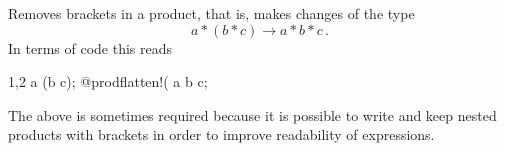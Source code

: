 
Removes brackets in a product, that is, makes changes of the type
\begin{equation}
a*(b*c) \rightarrow a*b*c\, .
\end{equation}
In terms of code this reads
\begin{screen}{1,2}
a (b c);
@prodflatten!(%
a b c;
\end{screen}
The above is sometimes required because it is possible to write and
keep nested products with brackets in order to improve readability of
expressions. 
~


